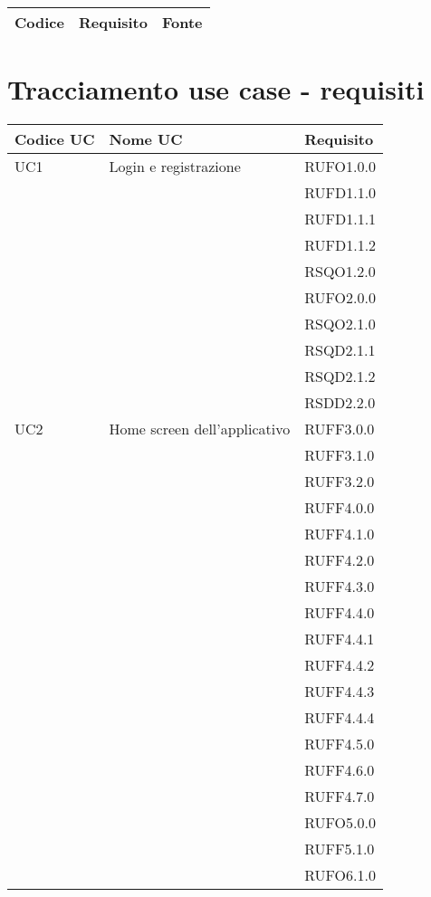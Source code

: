 \begin{center}
\begin{longtable}{lp{}l}
\toprule Codice & Requisito & Fonte\\
\midrule
\bottomrule
\end{longtable}
\end{center}
\newpage\section{Tracciamento use case - requisiti}\label{sec:tracciamento}

\begin{center}
\begin{longtable}{lp{}l}
\toprule Codice UC & Nome UC  & Requisito\\
\midrule
UC1 & Login e registrazione & RUFO1.0.0 \\
 &  & RUFD1.1.0 \\
 &  & RUFD1.1.1 \\
 &  & RUFD1.1.2 \\
 &  & RSQO1.2.0 \\
 &  & RUFO2.0.0 \\
 &  & RSQO2.1.0 \\
 &  & RSQD2.1.1 \\
 &  & RSQD2.1.2 \\
 &  & RSDD2.2.0 \\
UC2 & Home screen dell'applicativo & RUFF3.0.0 \\
 &  & RUFF3.1.0 \\
 &  & RUFF3.2.0 \\
 &  & RUFF4.0.0 \\
 &  & RUFF4.1.0 \\
 &  & RUFF4.2.0 \\
 &  & RUFF4.3.0 \\
 &  & RUFF4.4.0 \\
 &  & RUFF4.4.1 \\
 &  & RUFF4.4.2 \\
 &  & RUFF4.4.3 \\
 &  & RUFF4.4.4 \\
 &  & RUFF4.5.0 \\
 &  & RUFF4.6.0 \\
 &  & RUFF4.7.0 \\
 &  & RUFO5.0.0 \\
 &  & RUFF5.1.0 \\
 &  & RUFO6.1.0 \\

\end{longtable}
\end{center}
